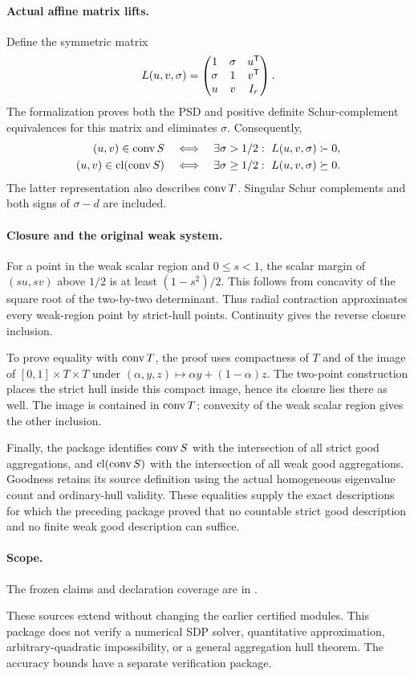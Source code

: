 \paragraph{Actual affine matrix lifts.}
Define the symmetric matrix
\[
 L(u,v,\sigma)=
 \begin{pmatrix}
 1&\sigma&u^{\mathsf T}\\
 \sigma&1&v^{\mathsf T}\\
 u&v&I_r
 \end{pmatrix}.
\]
The formalization proves both the PSD and positive definite
Schur-complement equivalences for this matrix and eliminates $\sigma$.
Consequently,
\begin{align*}
 (u,v)\in\operatorname{conv} S
 &\quad\Longleftrightarrow\quad
 \exists\sigma>1/2:\ L(u,v,\sigma)\succ0,\\
 (u,v)\in\operatorname{cl}(\operatorname{conv} S)
 &\quad\Longleftrightarrow\quad
 \exists\sigma\geq1/2:\ L(u,v,\sigma)\succeq0.
\end{align*}
The latter representation also describes $\operatorname{conv} T$. Singular Schur
complements and both signs of $\sigma-d$ are included.

\paragraph{Closure and the original weak system.}
For a point in the weak scalar region and $0\leq s<1$, the scalar margin
of $(su,sv)$ above $1/2$ is at least $(1-s^2)/2$. This follows from
concavity of the square root of the two-by-two determinant. Thus radial
contraction approximates every weak-region point by strict-hull points.
Continuity gives the reverse closure inclusion.

To prove equality with $\operatorname{conv} T$, the proof uses compactness of $T$ and
of the image of $[0,1]\times T\times T$ under
$(\alpha,y,z)\mapsto\alpha y+(1-\alpha)z$. The two-point construction
places the strict hull inside this compact image, hence its closure lies
there as well. The image is contained in $\operatorname{conv} T$; convexity of the weak
scalar region gives the other inclusion.

Finally, the package identifies $\operatorname{conv} S$ with the intersection of all
strict good aggregations, and $\operatorname{cl}(\operatorname{conv} S)$ with the intersection of all
weak good aggregations. Goodness retains its source definition using the
actual homogeneous eigenvalue count and ordinary-hull validity. These
equalities supply the exact descriptions for which the preceding package
proved that no countable strict good description and no finite weak good
description can suffice.

\paragraph{Scope.}
The frozen claims and declaration coverage
are in .

These sources extend  without changing the earlier
certified modules. This package does not verify a numerical SDP solver,
quantitative approximation, arbitrary-quadratic impossibility, or a
general aggregation hull theorem. The accuracy bounds have a separate
verification package.
